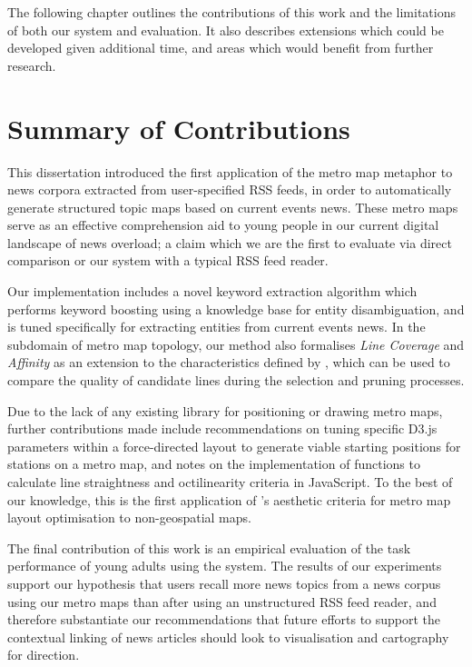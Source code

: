 The following chapter outlines the contributions of this work and the limitations of both our system and evaluation. It also describes extensions which could be developed given additional time, and areas which would benefit from further research.

\section{Summary of Contributions}

This dissertation introduced the first application of the metro map metaphor \citep{GeneratingInformationMaps} to news corpora extracted from user-specified RSS feeds, in order to automatically generate structured topic maps based on current events news. These metro maps serve as an effective comprehension aid to young people in our current digital landscape of news overload; a claim which we are the first to evaluate via direct comparison or our system with a typical RSS feed reader.

Our implementation includes a novel keyword extraction algorithm which performs keyword boosting using a knowledge base for entity disambiguation, and is tuned specifically for extracting entities from current events news. In the subdomain of metro map topology, our method also formalises \textit{Line Coverage} and \textit{Affinity} as an extension to the characteristics defined by \cite{GeneratingInformationMaps}, which can be used to compare the quality of candidate lines during the selection and pruning processes.

Due to the lack of any existing library for positioning or drawing metro maps, further contributions made include recommendations on tuning specific D3.js parameters within a force-directed layout to generate viable starting positions for stations on a metro map, and notes on the implementation of functions to calculate  line straightness and octilinearity criteria in JavaScript. To the best of our knowledge, this is the first application of \citeauthor{AutomaticMetroMapLayoutThesis}'s aesthetic criteria for metro map layout optimisation to non-geospatial maps.

The final contribution of this work is an empirical evaluation of the task performance of young adults using the system. The results of our experiments support our hypothesis that users recall more news topics from a news corpus using our metro maps than after using an unstructured RSS feed reader, and therefore substantiate our recommendations that future efforts to support the contextual linking of news articles should look to visualisation and cartography for direction.

